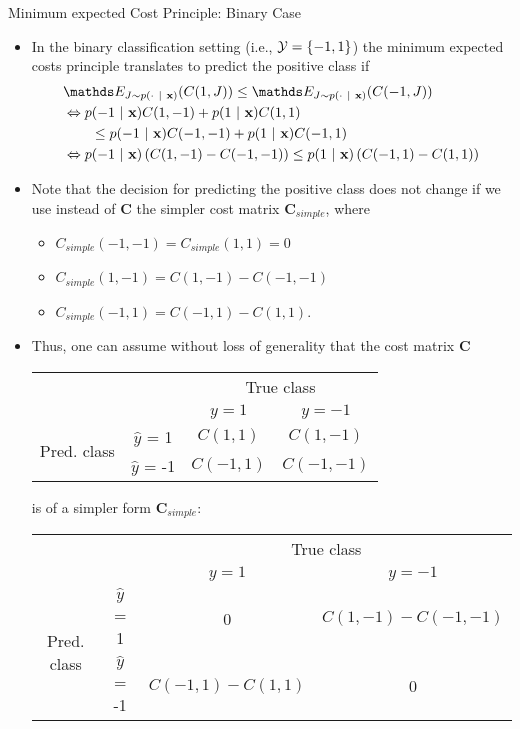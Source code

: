 \documentclass[11pt,compress,t,notes=noshow, xcolor=table]{beamer}
\begin{document}
\begin{vbframe}{Minimum expected Cost Principle: Binary Case}
	\footnotesize{
		\begin{itemize}\footnotesize
			\item In the binary classification setting (i.e., $\mathcal{Y} = \{-1,1\}$) the minimum expected costs principle translates to predict the positive class if 
%			
			\begin{align*}
%				
					&\E_{J \sim p(\cdot ~|~ \xv)}( C(1,J) )  \leq \E_{J \sim p(\cdot ~|~ \xv)}( C(-1,J) ) \\
%
				 	&\Leftrightarrow p(-1 ~|~ \xv ) C(1,-1)  + 	p(1 ~|~ \xv ) C(1,1) \\ &
				 	\qquad \leq  p(-1 ~|~ \xv ) C(-1,-1)  + 	p(1 ~|~ \xv ) C(-1,1)  \\
%				 	
					&\Leftrightarrow p(-1 ~|~ \xv ) \left( C(1,-1) - C(-1,-1) \right)  \leq  	p(1 ~|~ \xv ) \left( C(-1,1) -C(1,1)\right)  
%				
			\end{align*}
			\item Note that the decision for predicting the positive class does not change if we use instead of $\mathbf{C}$ the simpler cost matrix $\mathbf{C}_{simple}$, where 
			\begin{itemize}
				\footnotesize
				 \item $C_{simple}(-1,-1)=C_{simple}(1,1) = 0$ 
				 \item  $C_{simple}(1,-1) =  C(1,-1) - C(-1,-1) $ 
				 \item $C_{simple}(-1,1) = C(-1,1) -C(1,1).$
			\end{itemize} 
%		
		\item Thus, one can assume without loss of generality that the cost matrix $\mathbf{C}$
		\lz
		
		\begin{tabular}{cc|cc}
			& &\multicolumn{2}{c}{True class} \\
			& & $y=1$ & $y=-1$  \\
			\hline
			\multirow{2}{*}{\parbox{0.3cm}{Pred.  class}}& $\hat y$ = 1     & $C(1,1)$                & $C(1,-1)$\\
			& $\hat y$ = -1 & $C(-1,1)$              &  $C(-1,-1)$   \\
		\end{tabular}
%		

		\lz
		is of a simpler form  $\mathbf{C}_{simple}$:
		\lz
		\lz
		
%		
		\begin{tabular}{cc|cc}
			& &\multicolumn{2}{c}{True class} \\
			& & $y=1$ & $y=-1$  \\
			\hline
			\multirow{2}{*}{\parbox{0.3cm}{Pred.  class}}& $\hat y$ = 1     & 0                 & $C(1,-1) - C(-1,-1) $\\
			& $\hat y$ = -1 & $C(-1,1) -C(1,1)$              & 0\\
		\end{tabular}


\end{itemize}}
\end{vbframe}
\end{document}
